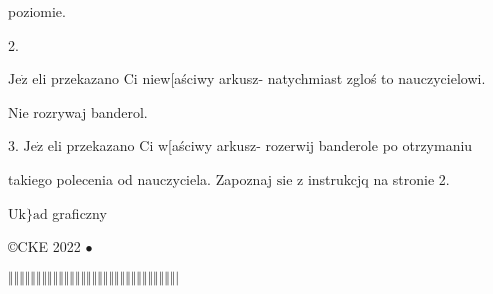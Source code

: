 \documentclass[a4paper,12pt]{article}
\begin{document}
poziomie.

2.

$\mathrm{J}\mathrm{e}\dot{\mathrm{z}}$ eli przekazano Ci niew[aściwy arkusz- natychmiast zgloś to nauczycielowi.

Nie rozrywaj banderol.

3. $\mathrm{J}\mathrm{e}\dot{\mathrm{z}}$ eli przekazano Ci w[aściwy arkusz- rozerwij banderole po otrzymaniu

takiego polecenia od nauczyciela. Zapoznaj $\mathrm{s}\mathrm{i}\mathrm{e}$ z instrukcjq na stronie 2.

$\mathrm{U}\mathrm{k}\}\mathrm{a}\mathrm{d}$ graficzny

\copyright CKE 2022 $\bullet$

$\Vert\Vert\Vert\Vert\Vert\Vert\Vert\Vert\Vert\Vert\Vert\Vert\Vert\Vert\Vert\Vert\Vert\Vert\Vert\Vert\Vert\Vert\Vert\Vert\Vert\Vert\Vert\Vert\Vert\Vert|$
\end{document}
